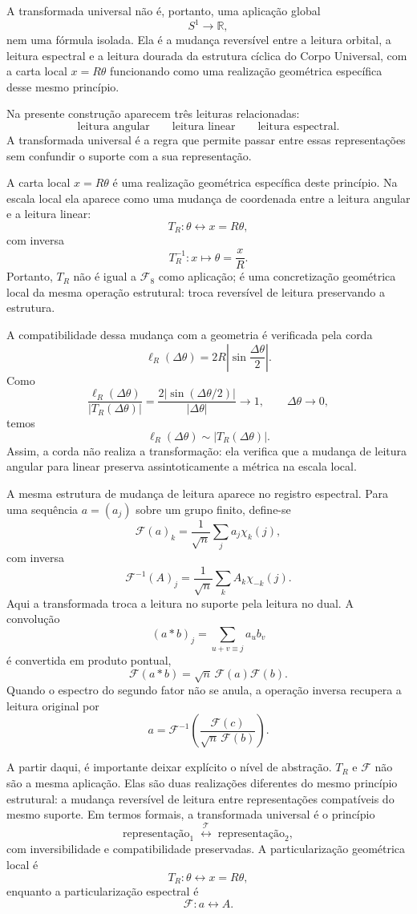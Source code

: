 \documentclass[11pt,a4paper]{article}
\begin{document}
A transformada universal não é, portanto, uma aplicação global
\[
S^1\longrightarrow\mathbb R,
\]
nem uma fórmula isolada. Ela é a mudança reversível entre a leitura orbital, a leitura espectral e a leitura dourada da estrutura cíclica do Corpo Universal, com a carta local $x=R\theta$ funcionando como uma realização geométrica específica desse mesmo princípio.

Na presente construção aparecem três leituras relacionadas:
\[
\boxed{
\text{leitura angular}
\qquad
\text{leitura linear}
\qquad
\text{leitura espectral}.
}
\]
A transformada universal é a regra que permite passar entre essas representações sem confundir o suporte com a sua representação.

A carta local $x=R\theta$ é uma realização geométrica específica deste princípio. Na escala local ela aparece como uma mudança de coordenada entre a leitura angular e a leitura linear:
\[
\boxed{T_R:\theta\longleftrightarrow x=R\theta,}
\]
com inversa
\[
\boxed{T_R^{-1}:x\longmapsto \theta=\frac{x}{R}.}
\]
Portanto, $T_R$ não é igual a $\mathcal F_8$ como aplicação; é uma concretização geométrica local da mesma operação estrutural: troca reversível de leitura preservando a estrutura.

A compatibilidade dessa mudança com a geometria é verificada pela corda
\[
\ell_R(\Delta\theta)=2R\left|\sin\frac{\Delta\theta}{2}\right|.
\]
Como
\[
\frac{\ell_R(\Delta\theta)}{|T_R(\Delta\theta)|}
=
\frac{2\left|\sin(\Delta\theta/2)\right|}{|\Delta\theta|}
\longrightarrow 1,
\qquad \Delta\theta\to 0,
\]
temos
\[
\boxed{\ell_R(\Delta\theta)\sim |T_R(\Delta\theta)|.}
\]
Assim, a corda não realiza a transformação: ela verifica que a mudança de leitura angular para linear preserva assintoticamente a métrica na escala local.

A mesma estrutura de mudança de leitura aparece no registro espectral. Para uma sequência $a=(a_j)$ sobre um grupo finito, define-se
\[
\boxed{
\mathcal F(a)_k
=
\frac1{\sqrt n}\sum_j a_j\chi_k(j),
}
\]
com inversa
\[
\boxed{
\mathcal F^{-1}(A)_j
=
\frac1{\sqrt n}\sum_k A_k\chi_{-k}(j).
}
\]
Aqui a transformada troca a leitura no suporte pela leitura no dual. A convolução
\[
(a*b)_j = \sum_{u+v\equiv j} a_u b_v
\]
é convertida em produto pontual,
\[
\boxed{
\mathcal F(a*b)=\sqrt n\,\mathcal F(a)\mathcal F(b).
}
\]
Quando o espectro do segundo fator não se anula, a operação inversa recupera a leitura original por
\[
\boxed{
 a = \mathcal F^{-1}\!\left(\frac{\mathcal F(c)}{\sqrt n\,\mathcal F(b)}\right).
}
\]

A partir daqui, é importante deixar explícito o nível de abstração. $T_R$ e $\mathcal F$ não são a mesma aplicação. Elas são duas realizações diferentes do mesmo princípio estrutural: a mudança reversível de leitura entre representações compatíveis do mesmo suporte. Em termos formais, a transformada universal é o princípio
\[
\boxed{
\text{representação}_1\; \overset{\mathcal T}{\longleftrightarrow}\; \text{representação}_2,
}
\]
com inversibilidade e compatibilidade preservadas. A particularização geométrica local é
\[
T_R:\theta\longleftrightarrow x=R\theta,
\]
 enquanto a particularização espectral é
\[
\mathcal F:a\longleftrightarrow A.
\]
\end{document}
